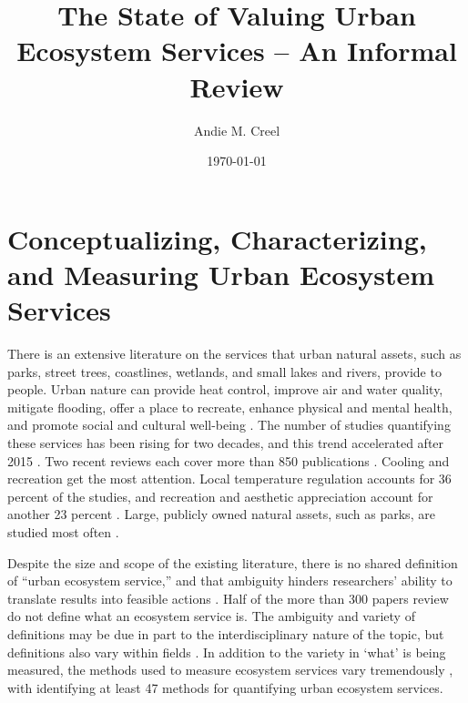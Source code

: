 \documentclass[12pt]{article}
\title{The State of Valuing Urban Ecosystem Services -- An Informal Review }
\author{Andie M. Creel}
\date{\today}
\begin{document}
\maketitle

\section{Conceptualizing, Characterizing, and Measuring Urban Ecosystem Services}\label{sec:intro}

There is an extensive literature on the services that urban natural assets, such as parks, street trees, coastlines, wetlands, and small lakes and rivers, provide to people. Urban nature can provide heat control, improve air and water quality, mitigate flooding, offer a place to recreate, enhance physical and mental health, and promote social and cultural well-being \citep{keelerSocialecologicalTechnologicalFactors2019, baro_mapping_2016}. The number of studies quantifying these services has been rising for two decades, and this trend accelerated after 2015 \citep{maReviewMethodsQuantifying2025}. Two recent reviews each cover more than 850 publications \citep{veerkampReviewStudiesAssessing2021, maReviewMethodsQuantifying2025}. Cooling and recreation get the most attention. Local temperature regulation accounts for 36 percent of the studies, and recreation and aesthetic appreciation account for another 23 percent \citep{veerkampReviewStudiesAssessing2021}. Large, publicly owned natural assets, such as parks, are studied most often \citep{veerkampReviewStudiesAssessing2021, maReviewMethodsQuantifying2025}.

Despite the size and scope of the existing literature, there is no shared definition of ``urban ecosystem service,'' and that ambiguity hinders researchers' ability to translate results into feasible actions \citep{tanConceptualFrameworkUntangle2020}. Half of the more than 300 papers \citet{tanConceptualFrameworkUntangle2020} review do not define what an ecosystem service is. The ambiguity and variety of definitions may be due in part to the interdisciplinary nature of the topic, but definitions also vary within fields \citep{boydWhatAreEcosystem2007}.  In addition to the variety in `what' is being measured, the methods used to measure ecosystem services vary tremendously \citep{veerkampReviewStudiesAssessing2021}, with \citet{maReviewMethodsQuantifying2025} identifying at least 47 methods for quantifying urban ecosystem services.
\end{document}
